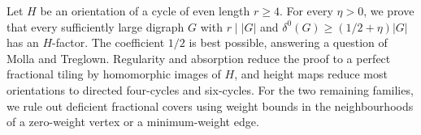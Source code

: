 Let $H$ be an orientation of a cycle of even length $r\ge4$.
For every $\eta>0$, we prove that every sufficiently large digraph $G$ with $r\mid|G|$ and $\delta^0(G)\ge(1/2+\eta)|G|$ has an $H$-factor.
The coefficient $1/2$ is best possible, answering a question of Molla and Treglown.
Regularity and absorption reduce the proof to a perfect fractional tiling by homomorphic images of $H$, and height maps reduce most orientations to directed four-cycles and six-cycles.
For the two remaining families, we rule out deficient fractional covers using weight bounds in the neighbourhoods of a zero-weight vertex or a minimum-weight edge.
